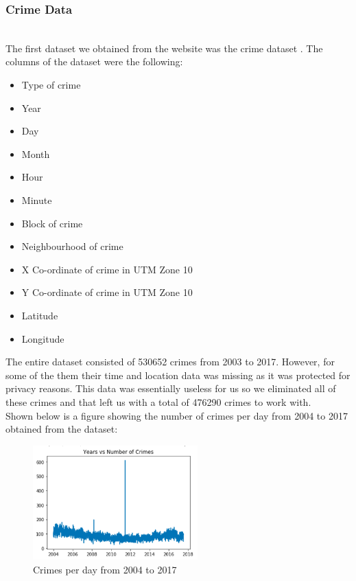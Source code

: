 \documentclass[conference]{IEEEtran}
\begin{document}
\subsubsection{Crime Data}

~\\The first dataset we obtained from the website was the crime dataset \cite{crime}. The columns of the dataset were the following:\\

\begin{itemize}
  \item Type of crime
  \item Year
  \item Day
  \item Month
  \item Hour
  \item Minute
  \item Block of crime
  \item Neighbourhood of crime
  \item X Co-ordinate of crime in UTM Zone 10
  \item Y Co-ordinate of crime in UTM Zone 10
  \item Latitude
  \item Longitude\\
\end{itemize}

The entire dataset consisted of 530652 crimes from 2003 to 2017. However, for some of the them their time
and location data was missing as it was protected for privacy reasons. This data was essentially useless for us so we eliminated
all of these crimes and that left us with a total of 476290 crimes to work with.\\

Shown below is a figure showing the number of crimes per day from 2004 to 2017 obtained from the dataset:

\begin{figure}[H]
  \centering
  \captionsetup{justification=centering}
  \centering
  \includegraphics[width=2.5in]{2.png}
  \caption{Crimes per day from 2004 to 2017}  
  \label{1}
\end{figure}
\end{document}
